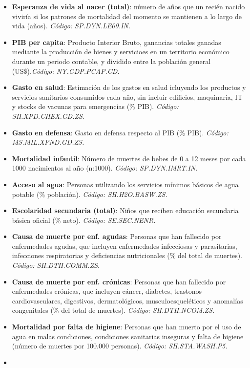 \documentclass[notspecified,article,submit,moreauthors,pdftex]{Definitions/mdpi}
\begin{document}
\begin{itemize}
\item
  \textbf{Esperanza de vida al nacer (total)}: número de años que un
  recién nacido viviría si los patrones de mortalidad del momento se
  mantienen a lo largo de vida (años). \emph{Código: SP.DYN.LE00.IN.}
\item
  \textbf{PIB per capita}: Producto Interior Bruto, ganancias totales
  ganadas mediante la producción de bienes y servicioes en un territorio
  económico durante un periodo contable, y dividido entre la población
  general (US\$).\emph{Código: NY.GDP.PCAP.CD.}
\item
  \textbf{Gasto en salud}: Estimación de los gastos en salud icluyendo
  los productos y servicios sanitarios consumidos cada año, sin incluir
  edificios, maquinaria, IT y stocks de vacunas para emergencias (\%
  PIB). \emph{Código: SH.XPD.CHEX.GD.ZS.}
\item
  \textbf{Gasto en defensa}: Gasto en defensa respecto al PIB (\% PIB).
  \emph{Código: MS.MIL.XPND.GD.ZS.}
\item
  \textbf{Mortalidad infantil}: Número de muertes de bebes de 0 a 12
  meses por cada 1000 nacimientos al año (n:1000). \emph{Código:
  SP.DYN.IMRT.IN}.
\item
  \textbf{Acceso al agua}: Personas utilizando los servicios mínimos
  básicos de agua potable (\% población). \emph{Código: SH.H2O.BASW.ZS.}
\item
  \textbf{Escolaridad secundaria (total)}: Niños que reciben educación
  secundaria básica oficial (\% neto). \emph{Código: SE.SEC.NENR.}
\item
  \textbf{Causa de muerte por enf. agudas}: Personas que han fallecido
  por enfermedades agudas, que incluyen enfermedades infecciosas y
  parasitarias, infecciones respiratorias y deficiencias nutricionales
  (\% del total de muertes). \emph{Código: SH.DTH.COMM.ZS}.
\item
  \textbf{Causa de muerte por enf. crónicas}: Personas que han fallecido
  por enfermedades crónicas, que incluyen cáncer, diabetes, trastonos
  cardiovasculares, digestivos, dermatológicos, musculoesqueléticos y
  anomalías congenitales (\% del total de muertes). \emph{Código:
  SH.DTH.NCOM.ZS.}
\item
  \textbf{Mortalidad por falta de higiene}: Personas que han muerto por
  el uso de agua en malas condiciones, condiciones sanitarias inseguras
  y falta de higiene (número de muertes por 100.000 personas).
  \emph{Código: SH.STA.WASH.P5.}
\item

\end{itemize}
\end{document}
